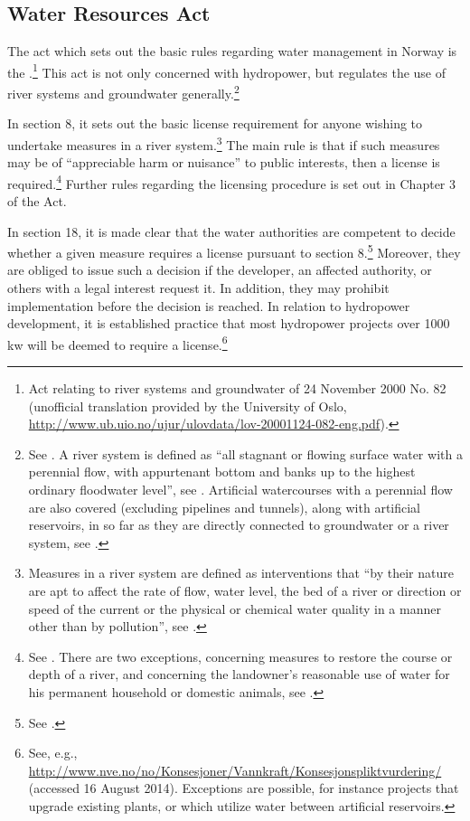 \subsection{Water Resources Act}

The act which sets out the basic rules regarding water management in Norway is the \cite{wra00}.\footnote{Act relating to river systems and groundwater of 24 November 2000 No. 82 (unofficial translation provided by the University of Oslo, \url{http://www.ub.uio.no/ujur/ulovdata/lov-20001124-082-eng.pdf}).} This act is not only concerned with hydropower, but regulates the use of river systems and groundwater generally.\footnote{See \cite[1]{wra00}. A river system is defined as ``all stagnant or flowing surface water with a perennial flow, with appurtenant bottom and banks up to the highest ordinary floodwater level'', see \cite[2]{wra00}. Artificial watercourses with a perennial flow are also covered (excluding pipelines and tunnels), along with artificial reservoirs, in so far as they are directly connected to groundwater or a river system, see \cite[2a-2b]{wra00}.} 

In section 8, it sets out the basic license requirement for anyone wishing to undertake measures in a river system.\footnote{Measures in a river system are defined as interventions that ``by their nature are apt to affect the rate of flow, water level, the bed of a river or direction or speed of the current or the physical or chemical water quality in a manner other than by pollution'', see \cite[3a]{wra00}.} The main rule is that if such measures may be of ``appreciable harm or nuisance''  to public interests, then a license is required.\footnote{See \cite[8]{wra00}. There are two exceptions, concerning measures to restore the course or depth of a river, and concerning the landowner's reasonable use of water for his permanent household or domestic animals, see \cite[12|15]{wra00}.} Further rules regarding the licensing procedure is set out in Chapter 3 of the Act.

In section 18, it is made clear that the water authorities are competent to decide whether a given measure requires a license pursuant to section 8.\footnote{See \cite[18]{wra00}.}  Moreover, they are obliged to issue such a decision if the developer, an affected authority, or others with a legal interest request it. In addition, they may prohibit implementation before the decision is reached. In relation to hydropower development, it is established practice that most hydropower projects over 1000 kw will be deemed to require a license.\footnote{See, e.g., \url{http://www.nve.no/no/Konsesjoner/Vannkraft/Konsesjonspliktvurdering/} (accessed 16 August 2014). Exceptions are possible, for instance projects that upgrade existing plants, or which utilize water between artificial reservoirs.}

